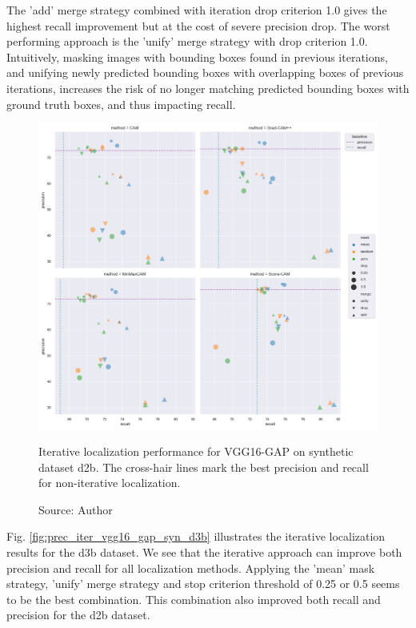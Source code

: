 The 'add' merge strategy combined with iteration drop criterion 1.0 gives the highest recall improvement but at the cost of severe precision drop. The worst performing approach is the 'unify' merge strategy with drop criterion 1.0. Intuitively, masking images with bounding boxes found in previous iterations, and unifying newly predicted bounding boxes with overlapping boxes of previous iterations, increases the risk of no longer matching predicted bounding boxes with ground truth boxes, and thus impacting recall.

\begin{figure}[ht]
    \begin{center}       
    \includegraphics[width=1.0\textwidth]{images/fig_iter_vgg16_gap_syn_d2b.png}
    \caption[Iterative localization performance for VGG16-GAP on synthetic dataset d2b]{Iterative localization performance for VGG16-GAP on synthetic dataset d2b. The cross-hair lines mark the best precision and recall for non-iterative localization.}
    \caption*{Source: Author}
    \label{fig:prec_iter_vgg16_gap_syn_d2b}
    \end{center}
\end{figure}

Fig. \ref{fig:prec_iter_vgg16_gap_syn_d3b} illustrates the iterative localization results for the d3b dataset. We see that the iterative approach can improve both precision and recall for all localization methods. Applying the 'mean' mask strategy, 'unify' merge strategy and stop criterion threshold of 0.25 or 0.5 seems to be the best combination. This combination also improved both recall and precision for the d2b dataset.

